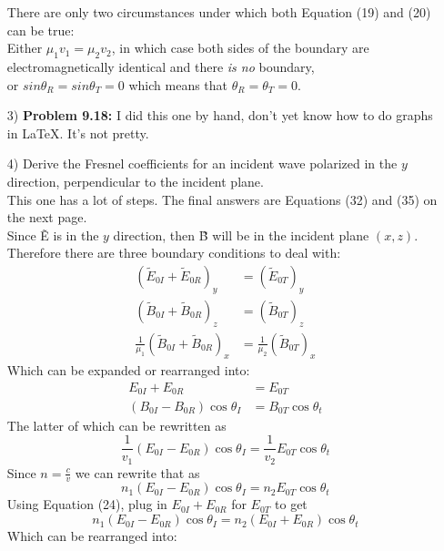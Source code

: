 \documentclass{report}
\begin{document}
\begin{itemize}
There are only two circumstances under which both Equation (19) and (20) can be true: \\
Either $\mu_1v_1 = \mu_2v_2$, in which case both sides of the boundary are electromagnetically identical and there \textit{is no} boundary,\\
or $sin{\theta_R} = sin{\theta_T} = 0$ which means that $\theta_R = \theta_T = 0$.
\item[3)] \textbf{Problem 9.18:} I did this one by hand, don't yet know how to do graphs in \LaTeX. It's not pretty.
\item[4)] Derive the Fresnel coefficients for an incident wave polarized in the $y$ direction, perpendicular to the incident plane.\\ \newline
This one has a lot of steps. The final answers are Equations (32) and (35) on the next page. \\ \newline
Since \~{E} is in the $y$ direction, then \~{B} will be in the incident plane $(x,z)$. Therefore there are three boundary conditions to deal with:
\begin{align}
  (\tilde{E}_{0I}+\tilde{E}_{0R})_{y} & = (\tilde{E}_{0T})_{y}\\
  (\tilde{B}_{0I}+\tilde{B}_{0R})_{z} & = (\tilde{B}_{0T})_{z}\\
  \frac{1}{\mu_1}(\tilde{B}_{0I}+\tilde{B}_{0R})_{x} & = \frac{1}{\mu_2}(\tilde{B}_{0T})_{x}
\end{align}
Which can be expanded or rearranged into:
\begin{align}
  E_{0I}+E_{0R} & = E_{0T}\\
  (B_{0I}-B_{0R})\cos{\theta_I} & = B_{0T}\cos{\theta_t}
\end{align}
The latter of which can be rewritten as
\begin{equation}
  \frac{1}{v_1} (E_{0I}-E_{0R})\cos{\theta_I}  = \frac{1}{v_2} E_{0T}\cos{\theta_t}
\end{equation}
Since $n=\frac{c}{v}$ we can rewrite that as
\begin{equation}
  n_1(E_{0I}-E_{0R})\cos{\theta_I}  = n_2 E_{0T}\cos{\theta_t}
\end{equation}
Using Equation (24), plug in $  E_{0I}+E_{0R}$ for $E_{0T}$ to get
\begin{equation}
  n_1(E_{0I}-E_{0R})\cos{\theta_I}  = n_2 (E_{0I}+E_{0R})\cos{\theta_t}
\end{equation}
Which can be rearranged into:
\begin{equation}

\end{equation}
\end{itemize}
\end{document}
